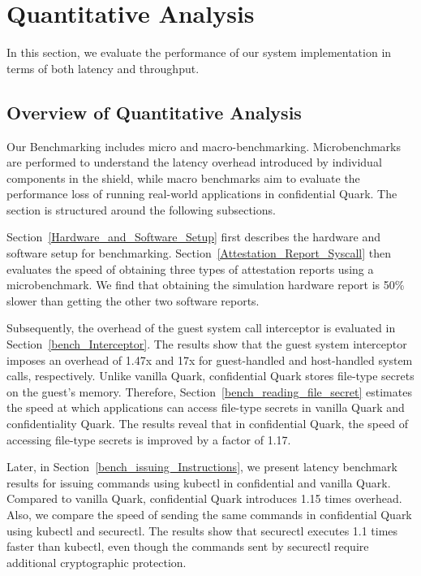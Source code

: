 \section{Quantitative Analysis}
In this section, we evaluate the performance of our system implementation in terms of both latency and throughput.

\subsection{Overview of Quantitative Analysis}

Our Benchmarking includes micro and macro-benchmarking. Microbenchmarks are performed to understand the latency overhead introduced by individual components in the shield, while macro benchmarks aim to evaluate the performance loss of running real-world applications in confidential Quark. 
The section is structured around the following subsections.

Section~\ref{Hardware_and_Software_Setup} first describes the hardware and software setup for benchmarking. Section~\ref{Attestation_Report_Syscall} then evaluates the speed of obtaining three types of attestation reports using a microbenchmark. We find that obtaining the simulation hardware report 
is 50\% slower than getting the other two software reports.

Subsequently, the overhead of the guest system call interceptor is evaluated in Section~\ref{bench_Interceptor}. The results show that the guest system interceptor imposes an overhead of 1.47x and 17x for guest-handled and host-handled system calls, respectively. Unlike vanilla Quark, 
confidential Quark stores file-type secrets on the guest's memory. Therefore, Section~\ref{bench_reading_file_secret} estimates the speed at which applications can access file-type secrets in vanilla Quark and confidentiality Quark. The results reveal that in confidential Quark, the speed of 
accessing file-type secrets is improved by a factor of 1.17.

Later, in Section~\ref{bench_issuing_Instructions}, we present latency benchmark results for issuing commands using kubectl in confidential and vanilla Quark. Compared to vanilla Quark, confidential Quark introduces 1.15 times overhead. Also, we compare the speed of sending the same commands in 
confidential Quark using kubectl and securectl. The results show that securectl executes 1.1 times faster than kubectl, even though the commands sent by securectl require additional cryptographic protection.


